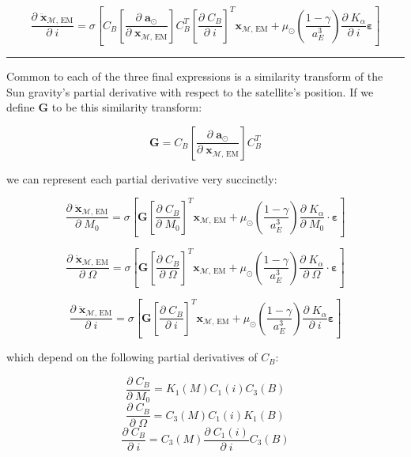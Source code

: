 \documentclass[]{article}
\newcommand{\pd}[2]{\frac{\partial\;#1}{\partial\;#2}}
\begin{document}
	\begin{equation}
		\pd{\ddot{\mathbf{x}}_{\mathcal{M}\text{, EM}}}{i} = \sigma \left[ C_B \left[\pd{\mathbf{a}_{\odot}}{ \mathbf{x}_{\mathcal{M}\text{, EM}} }\right] C_B^T \left[ \pd{C_B}{i} \right]^T \mathbf{x}_{\mathcal{M}\text{, EM}} + \mu_\odot \left(\frac{1-\gamma}{a_E^3}\right) \pd{K_\alpha}{i} \boldsymbol{\varepsilon} \right]
	\end{equation}
	
	\hrule \vspace{1em}
	
	Common to each of the three final expressions is a similarity transform of the Sun gravity's partial derivative with respect to the satellite's position.  If we define $\mathbf{G}$ to be this similarity transform:
	
	\begin{equation*}
		\mathbf{G} = C_B \left[\pd{\mathbf{a}_{\odot}}{ \mathbf{x}_{\mathcal{M}\text{, EM}} }\right] C_B^T
	\end{equation*}
	
	we can represent each partial derivative very succinctly:
	
	
	\begin{equation}
		\pd{\ddot{\mathbf{x}}_{\mathcal{M}\text{, EM}}}{M_0} = \sigma \left[ \mathbf{G} \left[ \pd{C_B}{M_0} \right]^T \mathbf{x}_{\mathcal{M}\text{, EM}} + \mu_\odot \left(\frac{1-\gamma}{a_E^3}\right) \pd{K_\alpha}{M_0} \cdot \boldsymbol{\varepsilon} \right]
	\end{equation}
	
	\begin{equation}
		\pd{\ddot{\mathbf{x}}_{\mathcal{M}\text{, EM}}}{\Omega} = \sigma \left[ \mathbf{G} \left[ \pd{C_B}{\Omega} \right]^T \mathbf{x}_{\mathcal{M}\text{, EM}} + \mu_\odot \left(\frac{1-\gamma}{a_E^3}\right) \pd{K_\alpha}{\Omega} \cdot \boldsymbol{\varepsilon} \right]
	\end{equation}
	
	\begin{equation}
		\pd{\ddot{\mathbf{x}}_{\mathcal{M}\text{, EM}}}{i} = \sigma \left[ \mathbf{G} \left[ \pd{C_B}{i} \right]^T \mathbf{x}_{\mathcal{M}\text{, EM}} + \mu_\odot \left(\frac{1-\gamma}{a_E^3}\right) \pd{K_\alpha}{i} \boldsymbol{\varepsilon} \right]
	\end{equation}
	
	which depend on the following partial derivatives of $C_B$:
	
	\begin{equation*}
		\pd{C_B}{M_0} = K_1(M) C_1(i) C_3(B)
	\end{equation*}
	\begin{equation*}
		\pd{C_B}{\Omega} = C_3(M) C_1(i) K_1(B)
	\end{equation*}
	\begin{equation*}
		\pd{C_B}{i} = C_3(M) \pd{C_1(i)}{i} C_3(B)
	\end{equation*}
	
\end{document}
